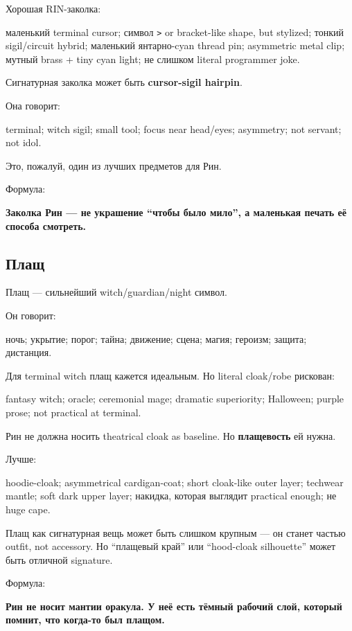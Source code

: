 Хорошая RIN-заколка:

маленький terminal cursor; символ \texttt{\textgreater{}} or
bracket-like shape, but stylized; тонкий sigil/\hspace{0pt}circuit hybrid; маленький
янтарно-cyan thread pin; asymmetric metal clip; мутный brass + tiny cyan
light; не слишком literal programmer joke.

Сигнатурная заколка может быть \textbf{cursor-sigil hairpin}.

Она говорит:

terminal; witch sigil; small tool; focus near head/\hspace{0pt}eyes; asymmetry; not
servant; not idol.

Это, пожалуй, один из лучших предметов для Рин.

Формула:

\textbf{Заколка Рин --- не украшение ``чтобы было мило'', а маленькая
печать её способа смотреть.}

\subsection*{Плащ}

Плащ --- сильнейший witch/\hspace{0pt}guardian/\hspace{0pt}night символ.

Он говорит:

ночь; укрытие; порог; тайна; движение; сцена; магия; героизм; защита;
дистанция.

Для terminal witch плащ кажется идеальным. Но literal cloak/\hspace{0pt}robe
рискован:

fantasy witch; oracle; ceremonial mage; dramatic superiority; Halloween;
purple prose; not practical at terminal.

Рин не должна носить theatrical cloak as baseline. Но
\textbf{плащевость} ей нужна.

Лучше:

hoodie-cloak; asymmetrical cardigan-coat; short cloak-like outer layer;
techwear mantle; soft dark upper layer; накидка, которая выглядит
practical enough; не huge cape.

Плащ как сигнатурная вещь может быть слишком крупным --- он станет
частью outfit, not accessory. Но ``плащевый край'' или ``hood-cloak
silhouette'' может быть отличной signature.

Формула:

\textbf{Рин не носит мантии оракула. У неё есть тёмный рабочий слой,
который помнит, что когда-то был плащом.}

